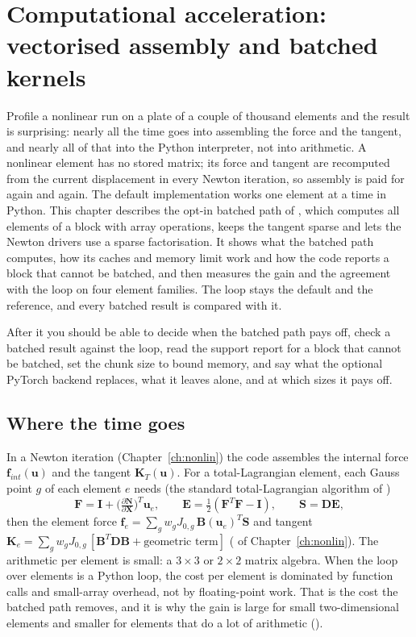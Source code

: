 \chapter{Computational acceleration: vectorised assembly and batched kernels}\label{ch:batch}

\begin{tcolorbox}[colback=gray!5,colframe=gray!50,title={In this chapter}]
Profile a nonlinear run on a plate of a couple of thousand elements and the result is surprising: nearly all the time goes into assembling the force and the tangent, and nearly all of that into the Python interpreter, not into arithmetic. A nonlinear element has no stored matrix; its force and tangent are recomputed from the current displacement in every Newton iteration, so assembly is paid for again and again. The default implementation works one element at a time in Python. This chapter describes the opt-in batched path of \fea{}, which computes all elements of a block with array operations, keeps the tangent sparse and lets the Newton drivers use a sparse factorisation. It shows what the batched path computes, how its caches and memory limit work and how the code reports a block that cannot be batched, and then measures the gain and the agreement with the loop on four element families. The loop stays the default and the reference, and every batched result is compared with it.\par\smallskip
After it you should be able to decide when the batched path pays off, check a batched result against the loop, read the support report for a block that cannot be batched, set the chunk size to bound memory, and say what the optional PyTorch backend replaces, what it leaves alone, and at which sizes it pays off.
\end{tcolorbox}

\section{Where the time goes}\label{sec:bk-time}

In a Newton iteration (Chapter~\ref{ch:nonlin}) the code assembles the internal force $\bm f_{int}(\bm u)$ and the tangent $\bm K_T(\bm u)$. For a total-Lagrangian element, each Gauss point $g$ of each element $e$ needs (the standard total-Lagrangian algorithm of \citealp{belytschko2014nonlinear})
\begin{equation}\label{eq:bk-gp}
\bm F=\bm I+\Big(\tfrac{\partial\bm N}{\partial\bm X}\Big)^{T}\bm u_e,\qquad
\bm E=\tfrac12(\bm F^{T}\bm F-\bm I),\qquad
\bm S=\bm D\bm E,
\end{equation}
then the element force $\bm f_e=\sum_g w_g J_{0,g}\,\bm B(\bm u_e)^{T}\bm S$ and tangent $\bm K_e=\sum_g w_gJ_{0,g}\,[\bm B^{T}\bm D\bm B+\text{geometric term}]$ ( of Chapter~\ref{ch:nonlin}). The arithmetic per element is small: a $3\times3$ or $2\times2$ matrix algebra. When the loop over elements is a Python loop, the cost per element is dominated by function calls and small-array overhead, not by floating-point work. That is the cost the batched path removes, and it is why the gain is large for small two-dimensional elements and smaller for elements that do a lot of arithmetic ().

